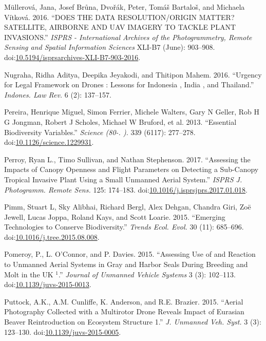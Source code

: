 \documentclass[]{interact}
\theoremstyle{plain}%
\theoremstyle{definition}
\theoremstyle{remark}
\begin{document}
\hypertarget{ref-mullerova_does_2016}{}
Müllerová, Jana, Josef Brůna, Dvořák, Peter, Tomáš Bartaloš, and
Michaela Vítková. 2016. ``DOES THE DATA RESOLUTION/ORIGIN MATTER?
SATELLITE, AIRBORNE AND UAV IMAGERY TO TACKLE PLANT INVASIONS.''
\emph{ISPRS - International Archives of the Photogrammetry, Remote
Sensing and Spatial Information Sciences} XLI-B7 (June): 903--908.
doi:\href{https://doi.org/10.5194/isprsarchives-XLI-B7-903-2016}{10.5194/isprsarchives-XLI-B7-903-2016}.

\hypertarget{ref-nugraha_urgency_2016}{}
Nugraha, Ridha Aditya, Deepika Jeyakodi, and Thitipon Mahem. 2016.
``Urgency for Legal Framework on Drones : Lessons for Indonesia , India
, and Thailand.'' \emph{Indones. Law Rev.} 6 (2): 137--157.

\hypertarget{ref-pereira_essential_2013}{}
Pereira, Henrique Miguel, Simon Ferrier, Michele Walters, Gary N Geller,
Rob H G Jongman, Robert J Scholes, Michael W Bruford, et al. 2013.
``Essential Biodiversity Variables.'' \emph{Science (80-. ).} 339
(6117): 277--278.
doi:\href{https://doi.org/10.1126/science.1229931}{10.1126/science.1229931}.

\hypertarget{ref-perroy_assessing_2017}{}
Perroy, Ryan L., Timo Sullivan, and Nathan Stephenson. 2017. ``Assessing
the Impacts of Canopy Openness and Flight Parameters on Detecting a
Sub-Canopy Tropical Invasive Plant Using a Small Unmanned Aerial
System.'' \emph{ISPRS J. Photogramm. Remote Sens.} 125: 174--183.
doi:\href{https://doi.org/10.1016/j.isprsjprs.2017.01.018}{10.1016/j.isprsjprs.2017.01.018}.

\hypertarget{ref-pimm_emerging_2015}{}
Pimm, Stuart L, Sky Alibhai, Richard Bergl, Alex Dehgan, Chandra Giri,
Zoë Jewell, Lucas Joppa, Roland Kays, and Scott Loarie. 2015. ``Emerging
Technologies to Conserve Biodiversity.'' \emph{Trends Ecol. Evol.} 30
(11): 685--696.
doi:\href{https://doi.org/10.1016/j.tree.2015.08.008}{10.1016/j.tree.2015.08.008}.

\hypertarget{ref-pomeroy_assessing_2015}{}
Pomeroy, P., L. O'Connor, and P. Davies. 2015. ``Assessing Use of and
Reaction to Unmanned Aerial Systems in Gray and Harbor Seals During
Breeding and Molt in the UK \(^{\textrm{1}}\).'' \emph{Journal of
Unmanned Vehicle Systems} 3 (3): 102--113.
doi:\href{https://doi.org/10.1139/juvs-2015-0013}{10.1139/juvs-2015-0013}.

\hypertarget{ref-puttock_aerial_2015}{}
Puttock, A.K., A.M. Cunliffe, K. Anderson, and R.E. Brazier. 2015.
``Aerial Photography Collected with a Multirotor Drone Reveals Impact of
Eurasian Beaver Reintroduction on Ecosystem Structure 1.'' \emph{J.
Unmanned Veh. Syst.} 3 (3): 123--130.
doi:\href{https://doi.org/10.1139/juvs-2015-0005}{10.1139/juvs-2015-0005}.
\end{document}
